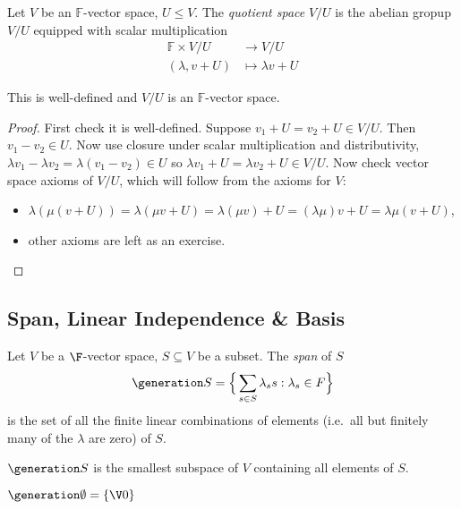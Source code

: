 \documentclass[a4paper]{article}
\newcommand*{\spans}{\generation}
\theoremstyle{definition}
\begin{document}
\begin{definition}
  Let $V$ be an $\mathbb{F}$-vector space, $U \leq V$. The \emph{quotient space} $V/U$ is the abelian gropup $V/U$ equipped with scalar multiplication
  \begin{align*}
    \mathbb{F} \times V/U &\to V/U \\
    (\lambda, v+U) &\mapsto \lambda v+U
  \end{align*}
\end{definition}

\begin{proposition}
  This is well-defined and $V/U$ is an $\mathbb{F}$-vector space.
\end{proposition}

\begin{proof}
  First check it is well-defined. Suppose $v_1+U= v_2+U \in V/U$. Then $v_1-v_2\in U$. Now use closure under scalar multiplication and distributivity, $\lambda v_1 - \lambda v_2 = \lambda(v_1-v_2)\in U$ so $\lambda v_1 + U = \lambda v_2 +U\in V/U$.
  Now check vector space axioms of $V/U$, which will follow from the axioms for $V$:
  \begin{itemize}
  \item $\lambda(\mu(v+U)) = \lambda(\mu v+U) = \lambda(\mu v)+U = (\lambda\mu) v+U = \lambda\mu(v+U)$,
  \item other axioms are left as an exercise.
  \end{itemize}
\end{proof}

\subsection{Span, Linear Independence \& Basis}

\begin{definition}[Span]
  Let $V$ be a $\F$-vector space, $S \subseteq V$ be a subset. The \emph{span} of $S$
  \[
    \spans S = \Big\{\sum_{s\in S} \lambda_s s : \lambda_s \in F \Big\}
  \]
  is the set of all the finite linear combinations of elements (i.e.\ all but finitely many of the $\lambda$ are zero) of $S$.
\end{definition}

\begin{remark}
  $\spans S$ is the smallest subspace of $V$ containing all elements of $S$.
\end{remark}

\begin{convention}
  $\spans \emptyset = \{\V 0\}$
\end{convention}
\end{document}
